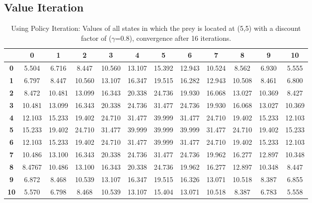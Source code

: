 \documentclass[11pt]{article}
\begin{document}
\subsection{Value Iteration}

\begin{center}
\begin{table*}[ht]
{\small
\hfill{}
\begin{tabular}{c|c|c|c|c|c|c|c|c|c|c|c}
\textbf{} & \textbf{0} & \textbf{1} & \textbf{2} & \textbf{3} & \textbf{4} & \textbf{5} & \textbf{6} & \textbf{7} & \textbf{8} & \textbf{9} & \textbf{10}\\
	\hline
\textbf{0} & 5.504 & 6.716 &
8.447 & 10.560 & 13.107 & 15.392 & 12.943 & 10.524 & 8.562 & 6.930 & 5.555\\
\textbf{1} & 6.797 & 8.447 & 10.560 & 13.107 & 16.347 & 19.515 & 16.282 & 12.943 & 10.508 & 8.461 & 6.800\\
\textbf{2} & 8.472 & 10.481 & 13.099 & 16.343 & 20.338 & 24.736 & 19.930 & 16.068 & 13.027 & 10.369 & 8.427\\
\textbf{3} & 10.481 & 13.099 & 16.343 & 20.338 & 24.736 & 31.477 & 24.736 & 19.930 & 16.068 & 13.027 & 10.369\\
\textbf{4} & 12.103 & 15.233 & 19.402 & 24.710 & 31.477 & 39.999 & 31.477 & 24.710 & 19.402 & 15.233 & 12.103\\
\textbf{5} & 15.233 & 19.402 & 24.710 & 31.477 & 39.999 & 39.999 & 39.999 & 31.477 & 24.710 & 19.402 & 15.233\\
\textbf{6} & 12.103 & 15.233 & 19.402 & 24.710 & 31.477 & 39.999 & 31.477 & 24.710 & 19.402 & 15.233 & 12.103\\
\textbf{7} & 10.486 & 13.100 & 16.343 & 20.338 & 24.736 & 31.477 & 24.736 & 19.962 & 16.277 & 12.897 & 10.348\\
\textbf{8} & 8.4767 & 10.486 & 13.100 & 16.343 & 20.338 & 24.736 & 19.962 & 16.277 & 12.897 & 10.348 & 8.447\\
\textbf{9} & 6.872 & 8.468 & 10.539 & 13.107 & 16.347 & 19.515 & 16.326 & 13.071 & 10.518 & 8.387 & 6.855\\
\textbf{10} & 5.570 & 6.798 & 8.468 & 10.539 & 13.107 & 15.404 & 13.071 & 10.518 & 8.387 & 6.783 & 5.558\\
\end{tabular}}
\hfill{}
\caption{Using Policy Iteration: Values of all states in which the prey is located at (5,5) with a discount factor of ($\gamma$=0.8), convergence after 16 iterations.}
\label{table:gamma=0.8}
\end{table*}
\end{center}
\end{document}
